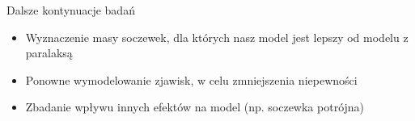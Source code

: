 \documentclass{beamer}
\begin{document}
\begin{frame}{Dalsze kontynuacje badań}
    \begin{itemize}
        \item Wyznaczenie masy soczewek, dla których nasz model jest lepszy od modelu z paralaksą
        \item Ponowne wymodelowanie zjawisk, w celu zmniejszenia niepewności
        \item Zbadanie wpływu innych efektów na model (np. soczewka potrójna)
    \end{itemize}
\end{frame}
\end{document}

